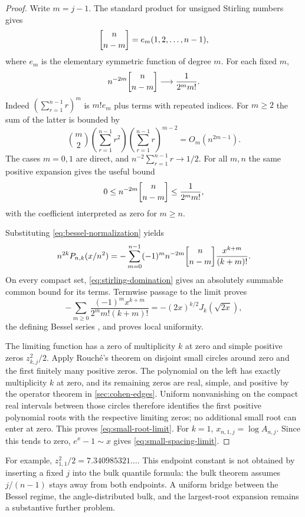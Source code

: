 \begin{proof}
Write $m=j-1$. The standard product for unsigned Stirling numbers gives
\[
 \stirling{n}{n-m}=e_m(1,2,\ldots,n-1),
\]
where $e_m$ is the elementary symmetric function of degree $m$.
For each fixed $m$,
\begin{equation}\label{eq:stirling-fixed-codimension}
 n^{-2m}\stirling{n}{n-m}
           \longrightarrow \frac1{2^m m!}.
\end{equation}
Indeed $(\sum_{r=1}^{n-1}r)^m$ is $m!e_m$ plus terms with repeated
indices. For $m\geq2$ the sum of the latter is bounded by
\[
 \binom m2\left(\sum_{r=1}^{n-1}r^2\right)
          \left(\sum_{r=1}^{n-1}r\right)^{m-2}
       =O_m(n^{2m-1}).
\]
The cases $m=0,1$ are direct, and
$n^{-2}\sum_{r=1}^{n-1}r\to1/2$.
For all $m,n$ the same positive expansion gives the useful bound
\begin{equation}\label{eq:stirling-domination}
 0\leq n^{-2m}\stirling{n}{n-m}
       \leq\frac1{2^m m!},
\end{equation}
with the coefficient interpreted as zero for $m\geq n$.

Substituting \eqref{eq:bessel-normalization} yields
\[
 n^{2k}P_{n,k}(x/n^2)
  =-\sum_{m=0}^{n-1}(-1)^m
       n^{-2m}\stirling{n}{n-m}\frac{x^{k+m}}{(k+m)!}.
\]
On every compact set, \eqref{eq:stirling-domination} gives an
absolutely summable common bound for its terms. Termwise passage to
the limit proves
\[
 -\sum_{m\geq0}\frac{(-1)^m x^{k+m}}{2^m m!(k+m)!}
       =-(2x)^{k/2}J_k(\sqrt{2x}),
\]
the defining Bessel series \cite{DLMFBessel}, and proves local uniformity.

The limiting function has a zero of multiplicity $k$ at zero and
simple positive zeros $z_{k,j}^2/2$. Apply Rouch\'e's theorem on
disjoint small circles around zero and the first finitely many positive
zeros. The polynomial on the left has exactly multiplicity $k$ at
zero, and its remaining zeros are real, simple, and positive by the
operator theorem in \cref{sec:cohen-edges}. Uniform nonvanishing on
the compact real intervals between those circles therefore identifies
the first positive polynomial roots with the respective limiting
zeros; no additional small root can enter at zero. This proves
\eqref{eq:small-root-limit}. For $k=1$, $x_{n,1,j}=\log A_{n,j}$.
Since this tends to zero, $e^x-1\sim x$ gives
\eqref{eq:small-spacing-limit}.
\end{proof}

For example, $z_{1,1}^2/2=7.340985321\ldots$. This endpoint constant
is not obtained by inserting a fixed $j$ into the bulk quantile formula:
the bulk theorem assumes $j/(n-1)$ stays away from both endpoints.
A uniform bridge between the Bessel regime, the angle-distributed
bulk, and the largest-root expansion remains a substantive further
problem.
